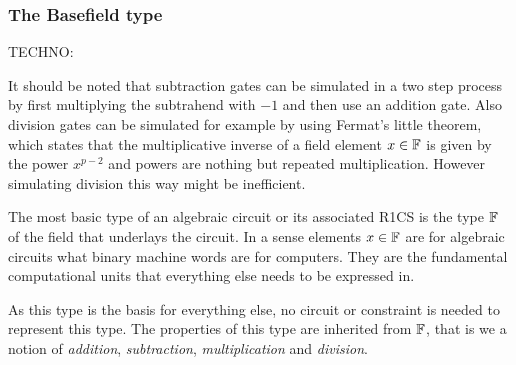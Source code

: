 \subsubsection{The Basefield type} 
TECHNO:

It should be noted that subtraction gates can be simulated in a two step process by first multiplying the subtrahend with $-1$ and then use an addition gate. Also division gates can be simulated for example by using Fermat's little theorem, which states that the multiplicative inverse of a field element $x\in\mathbb{F}$ is given by the power $x^{p-2}$ and powers are nothing but repeated multiplication. However simulating division this way might be inefficient.


The most basic type of an algebraic circuit or its associated R1CS is the type $\mathbb{F}$ of the field that underlays the circuit. In a sense elements $x\in\mathbb{F}$ are for algebraic circuits what binary machine words are for computers. They are the fundamental computational units that everything else needs to be expressed in. 

As this type is the basis for everything else, no circuit or constraint is needed to represent this type. The properties of this type are inherited from $\mathbb{F}$, that is we a notion of \textit{addition}, \textit{subtraction}, \textit{multiplication} and \textit{division}. 

